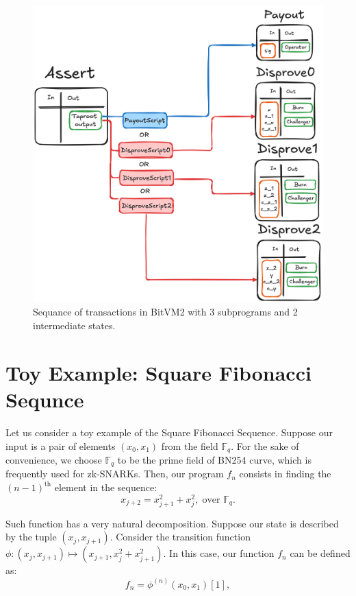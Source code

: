 \documentclass{iacrtrans}
\begin{document}
\begin{figure}[htbp]
  \centering
  \includegraphics[width=.9\linewidth]{../images/bitvm-txs.png}
  \caption{\label{fig:bitvm-txs}Sequance of transactions in BitVM2
  with 3 subprograms and 2 intermediate states.}
\end{figure}

\pagebreak
\section{Toy Example: Square Fibonacci Sequnce}\label{sec:covenants-emulation}

Let us consider a toy example of the Square Fibonacci Sequence. Suppose our input is a pair of elements $(x_0,x_1)$ from the field $\mathbb{F}_q$. For the sake of convenience, we choose $\mathbb{F}_q$ to be the prime field of BN254 curve, which is frequently used for zk-SNARKs. Then, our program $f_n$ consists in finding the $(n-1)^{\text{th}}$ element in the sequence:
\begin{equation*}
  x_{j+2} = x_{j+1}^2 + x_j^2, \; \text{over $\mathbb{F}_q$.}
\end{equation*}

Such function has a very natural decomposition. Suppose our state is described by the tuple $(x_j,x_{j+1})$. Consider the transition function $\phi: (x_j, x_{j+1}) \mapsto (x_{j+1}, x_j^2 + x_{j+1}^2)$. In this case, our function $f_n$ can be defined as:
\begin{equation*}
  f_n = \phi^{(n)}(x_0,x_1)[1],
\end{equation*}
\end{document}
